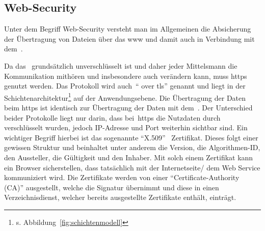 \subsection{Web-Security}\label{subsec:websecurity}
	Unter dem Begriff Web-Security versteht man im Allgemeinen die Absicherung der Übertragung von Dateien
	über das \gls{www} und damit auch in Verbindung mit dem~.

	Da das~ grundsätzlich unverschlüsselt ist
	und daher jeder Mittelsmann die Kommunikation mithören und insbesondere auch verändern kann,
	muss \gls{https} genutzt werden.
	Das Protokoll wird auch~\enquote{ over \gls{tls}} genannt
	und liegt in der Schichtenarchitektur\footnote{s. Abbildung~\ref{fig:schichtenmodell}} auf der Anwendungsebene.
	Die Übertragung der Daten beim \gls{https} ist identisch zur Übertragung der Daten mit dem~.
	Der Unterschied beider Protokolle liegt nur darin,
	dass bei~\gls{https} die Nutzdaten durch~ verschlüsselt wurden,
	jedoch IP-Adresse und Port weiterhin sichtbar sind.
	Ein wichtiger Begriff hierbei ist das sogenannte \enquote{X.509}~\cite[Vgl.][]{rfc5280} Zertifikat.
	Dieses folgt einer gewissen Struktur und beinhaltet unter anderem die Version,
	die Algorithmen-ID, den Aussteller, die Gültigkeit und den Inhaber.
	Mit solch einem Zertifikat kann ein Browser sicherstellen,
	dass tatsächlich mit der Internetseite/ dem Web Service kommuniziert wird.
	Die Zertifikate werden von einer \enquote{Certificate-Authority (CA)} ausgestellt,
	welche die Signatur übernimmt und diese in einen Verzeichnisdienst,
	welcher bereits ausgestellte Zertifikate enthält, einträgt.


